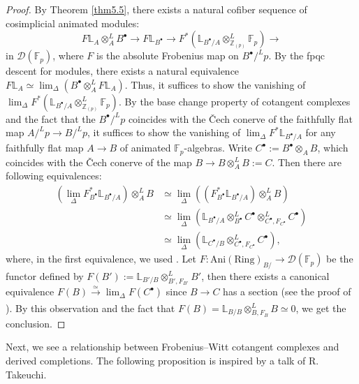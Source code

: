 \documentclass[11pt, a4paper]{amsart}
\theoremstyle{plain}
\theoremstyle{definition}
\begin{document}
\begin{proof}
    By Theorem \ref{thm5.5}, there exists a natural cofiber sequence of cosimplicial animated modules:\[F\mathbb L_A\otimes_A^LB^{\bullet}\to F\mathbb L_{B^{\bullet}}\to F^*(\mathbb L_{B^{\bullet}/A}\otimes_{\mathbb Z_{(p)}}^L\mathbb F_p)\to \] in $\mathcal D(\mathbb F_p)$, where $F$ is the absolute Frobenius map on $B^{\bullet}/^Lp$. By the fpqc descent for modules, there exists a natural equivalence $F\mathbb L_A\simeq \operatorname{lim}_{\Delta}(B^{\bullet}\otimes^L_{A}F\mathbb L_{A})$. Thus, it suffices to show the vanishing of $\operatorname{lim}_{\Delta}F^*(\mathbb L_{B^{\bullet}/A}\otimes_{\mathbb Z_{(p)}}^L\mathbb F_p)$. By the base change property of cotangent complexes and the fact that the $B^{\bullet}/^Lp$ coincides with the Čech conerve of the faithfully flat map $A/^Lp\to B/^Lp$, it suffices to show the vanishing of $\operatorname{lim}_{\Delta}F^*\mathbb L_{B^{\bullet}/A}$ for any faithfully flat map $A\to B$ of animated $\mathbb F_p$-algebras. Write $C^{\bullet}:=B^{\bullet}\otimes_AB$, which coincides with the Čech conerve of the map $B\to B\otimes_A^LB:=C$. Then there are following equivalences:\begin{align*}
        (\operatorname{lim}_{\Delta}F^*_{B^{\bullet}}\mathbb L_{B^{\bullet}/A})\otimes^L_AB&\simeq \operatorname{lim}_{\Delta}((F^*_{B^{\bullet}}\mathbb L_{B^{\bullet}/A})\otimes^L_AB)\\&\simeq \operatorname{lim}_{\Delta}(\mathbb L_{B^{\bullet}/A}\otimes^L_{B^{\bullet}}C^{\bullet}\otimes^L_{C^{\bullet},F_{C^{\bullet}}}C^{\bullet})\\&\simeq \operatorname{lim}_{\Delta}(\mathbb L_{C^{\bullet}/B}\otimes^L_{C^{\bullet},F_{C^{\bullet}}}C^{\bullet}),
    \end{align*}
    where, in the first equivalence, we used \cite[Lemma 4.22]{BS22}.
    Let $F:\operatorname{Ani(Ring)}_{B/}\to \mathcal D(\mathbb F_p)$ be the functor defined by $F(B'):=\mathbb L_{B'/B}\otimes^L_{B',F_{B'}}B'$, then there exists a canonical equivalence $F(B)\xrightarrow[]{\simeq }\operatorname{lim}_{\Delta}F(C^{\bullet})$ since $B\to C$ has a section (see the proof of \cite[Theorem 3.1]{BMS19}). By this observation and the fact that $F(B)=\mathbb L_{B/B}\otimes^L_{B,F_{B}}B\simeq 0$, we get the conclusion.
    
\end{proof}

Next, we see a relationship between Frobenius--Witt cotangent complexes and derived completions. The following proposition is inspired by a talk of R. Takeuchi.
\end{document}
